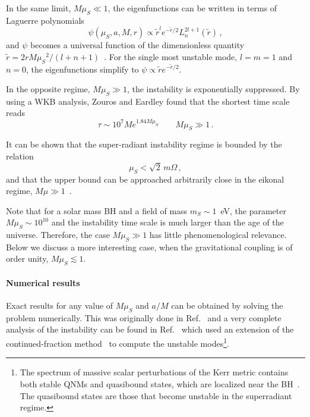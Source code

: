 \documentclass[11pt]{article}
\newcommand{\be}{\begin{equation}}
\newcommand{\ee}{\end{equation}}
\numberwithin{equation}{section} %
\begin{document}
In the same limit, $M\mu_S\ll1$, the eigenfunctions can be written in terms of Laguerre polynomials~\cite{Detweiler:1980uk,Yoshino:2013ofa}
%
\be
\psi(\mu_S,a,M,r)\propto\tilde{r}^l e^{-\tilde{r}/2}L_{n}^{2l+1}(\tilde{r})\,,\label{eigenfunctionDetweiler}
\ee
%
and $\psi$ becomes a universal function of the dimensionless quantity $\tilde{r}=2r M {\mu_S}^2/(l+n+1)$~\cite{Brito:2014wla}.
For the single most unstable mode, $l=m=1$ and $n=0$, the eigenfunctions simplify to $\psi\propto\tilde{r} e^{-\tilde{r}/2}$.


In the opposite regime, $M\mu_S\gg1$, the instability is exponentially suppressed. By using a WKB analysis,  Zouros and Eardley found that the shortest time scale reads~\cite{Zouros:1979iw}
\begin{equation}
 \tau \sim 10^7 M e^{1.84 M \mu_S} \qquad M\mu_S\gg1 \,.\label{Zouros}
\end{equation}
%




It can be shown that the super-radiant instability regime is bounded by the relation
%
\be
\mu_S<\sqrt{2}\,m\Omega\,,
\ee
%
and that the upper bound can be approached arbitrarily close in the eikonal regime, $M\mu\gg 1$~\cite{Hod:2012zza}.



Note that for a solar mass BH and a field of mass $m_S\sim 1$~eV, the parameter
$M\mu_S\sim10^{10}$ and the instability time scale is much larger than the age of the
universe. Therefore, the case $M\mu_S\gg1$ has little phenomenological relevance. Below we discuss a more interesting case, when the gravitational coupling is of order unity, $M\mu_S\lesssim1$.


\paragraph{Numerical results}
Exact results for any value of $M\mu_S$ and $a/M$ can be obtained by solving the problem numerically.
This was originally done in Ref.~\cite{Cardoso:2005vk} and a very complete analysis of the instability can be found in Ref.~\cite{Dolan:2007mj} which used an extension of the continued-fraction method~\cite{Berti:2009kk} to compute the unstable modes\footnote{The spectrum of massive scalar perturbations of the Kerr metric contains both stable QNMs and quasibound states, which are localized near the BH~\cite{Dolan:2007mj,Rosa:2011my,Pani:2012bp}. The quasibound states are those that become unstable in the superradiant regime.}.
\end{document}
